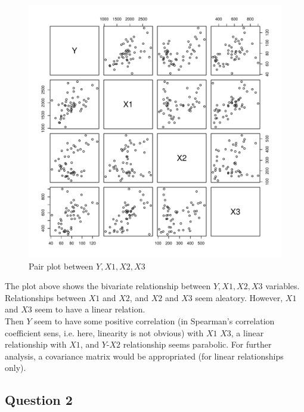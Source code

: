 \documentclass[12pt,letterpaper]{article}
\begin{document}
\begin{figure}[h!]\centering
	\caption{\footnotesize Pair plot between $Y,X1,X2,X3$ }
	\label{fig:plot_0}
	\includegraphics[width=.85\textwidth]{pairs.pdf}
\end{figure}

The plot above shows the bivariate relationship between $Y,X1,X2,X3$ variables.  Relationships between $X1$ and $X2$, and $X2$ and $X3$ seem aleatory. However, $X1$ and $X3$ seem to have a linear relation. \\
Then $Y$ seem to have some positive correlation (in  	Spearman's correlation coefficient sens, i.e. here, linearity is not obvious)  with $X1$  $X3$, a linear relationship with $X1$, and $Y$-$X2$ relationship seems parabolic. For further analysis, a covariance matrix would be appropriated (for linear relationships only).

\subsection*{Question 2}
\end{document}
